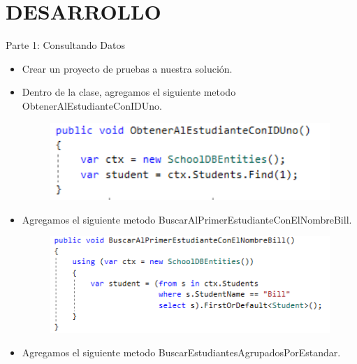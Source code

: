 \section{DESARROLLO} 
Parte 1: Consultando Datos
\begin{itemize}
\subsection{ANALISIS}
\subsection{DISEÑO}
\subsection{PRUEBAS}
	\item Crear un proyecto de pruebas a nuestra solución.
	\item Dentro de la clase, agregamos el siguiente metodo ObtenerAlEstudianteConIDUno.
	\begin{figure}[htb]
\begin{center}
\includegraphics[width=12cm]{./Imagenes/1-1}
\end{center}
\end{figure}
	\item Agregamos el siguiente metodo BuscarAlPrimerEstudianteConElNombreBill.
\begin{figure}[htb]
\begin{center}
\includegraphics[width=12cm]{./Imagenes/1-2}
\end{center}
\end{figure}
	\item Agregamos el siguiente metodo BuscarEstudiantesAgrupadosPorEstandar.
\begin{figure}[htb]

\end{figure}
\end{itemize}
